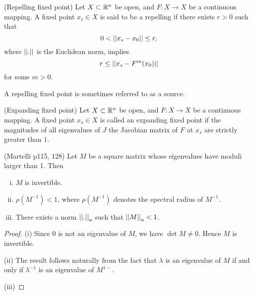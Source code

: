 \documentclass[12pt,draft,twoside]{book}
\begin{document}
\begin{definition}
  (Repelling fixed point)
  Let $X \subset \mathbb{R}^n$ be open, and $F: X \to X$ be a continuous mapping. 
  A fixed point $x_s \in X$ is said to be a repelling if there exists $r > 0$
  such that 
  \begin{equation*}
    0 < \left|\left| x_s - x_0 \right|\right| \leq r,
  \end{equation*}
  where $\left|\left| . \right|\right|$ is the Euclidean norm, implies
\begin{equation*}
  r \leq \left|\left| x_s - F^m(x_0) \right|\right|
\end{equation*}
for some $m > 0$.
\end{definition}
A repelling fixed point is sometimes referred to as a source.

\begin{definition}
  (Expanding fixed point)
  Let $X \subset \mathbb{R}^n$ be open, and $F: X \to X$ be a continuous mapping. 
  A fixed point $x_s \in  X$ is called an expanding fixed point if
  the magnitudes of all eigenvalues of $J$ the Jacobian matrix of $F$ at $x_s$ are strictly greater than $1$.
\end{definition}

\begin{lemma}
  (Martelli p115, 128)
  Let $M$ be a square matrix whose eigenvalues have moduli larger than 1.
  Then 
  \begin{enumerate}[(i)]
    \item $M$ is invertible.
    \item $\rho(M^{-1}) < 1$, where $\rho(M^{-1})$ denotes the spectral radius of $M^{-1}$.
    \item There exists a norm $\left|\left| . \right|\right|_a$ such that $\left|\left| M \right|\right|_a < 1$.
  \end{enumerate}
\end{lemma}
\begin{proof}
  (i) Since $0$ is not an eigenvalue of $M$, we have $\det M \neq 0$.
  Hence $M$ is invertible.

  (ii) The result follows naturally from the fact that
  $\lambda$ is an eigenvalue of $M$ if and only if $\lambda^{-1}$ is an eigenvalue of $M^{1-}$.

  (iii) 
\end{proof}
\end{document}

